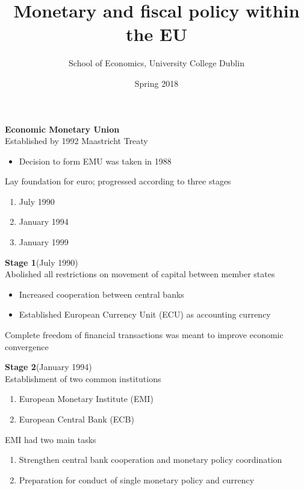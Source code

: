 \documentclass{beamer}
\title{Monetary and fiscal policy within the EU}
\author{School of Economics, University College Dublin}
\date{Spring 2018}
\begin{document}
\begin{frame}
 \titlepage
\end{frame}

\begin{frame}
  \textbf{Economic Monetary Union}\\
  Established by 1992 Maastricht Treaty
  \begin{itemize}
    \item Decision to form EMU was taken in 1988
  \end{itemize}
  \medskip
  Lay foundation for euro; progressed according to three stages
  \begin{enumerate}
    \item July 1990
    \item January 1994
    \item January 1999
  \end{enumerate}
\end{frame}

\begin{frame}
  \textbf{Stage 1}(July 1990)\\
  Abolished all restrictions on movement of capital between member states
  \begin{itemize}
    \item Increased cooperation between central banks
    \item Established European Currency Unit (ECU) as accounting currency    
  \end{itemize}
  \medskip
  Complete freedom of financial transactions was meant to improve economic convergence
\end{frame}

\begin{frame}
  \textbf{Stage 2}(January 1994)\\
  Establishment of two common institutions
  \begin{enumerate}
    \item European Monetary Institute (EMI)
    \item European Central Bank (ECB)
  \end{enumerate}
  \medskip
  EMI had two main tasks
  \begin{enumerate}
    \item Strengthen central bank cooperation and monetary policy coordination
    \item Preparation for conduct of single monetary policy and currency
  \end{enumerate}
\end{frame}
\end{document}
